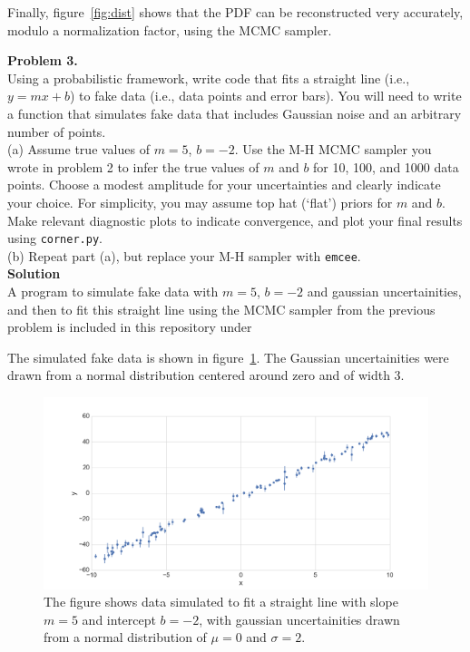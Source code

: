 \documentclass[12pt,usletter,english]{article}
\begin{document}
Finally, figure~\ref{fig:dist} shows that the PDF can be reconstructed
very accurately, modulo a normalization factor, using the MCMC
sampler. 

\newpage

\noindent \textbf{Problem 3.} \\ 

\noindent Using a probabilistic framework, write code that fits a
straight line (i.e., $y=mx+b$) to fake data (i.e., data points and
error bars).  You will need to write a function that simulates fake
data that includes Gaussian noise and an arbitrary number of
points. \\

(a) Assume true values of $m=5$, $b=-2$. Use the M-H MCMC sampler you
wrote in problem 2 to infer the true values of $m$ and $b$ for 10,
100, and 1000 data points.  Choose a modest amplitude for your
uncertainties and clearly indicate your choice. For simplicity, you
may assume top hat (`flat') priors for $m$ and $b$. Make relevant
diagnostic plots to indicate convergence, and plot your final results
using \texttt{corner.py}. \\

(b) Repeat part (a), but replace your M-H sampler with
\texttt{emcee}. \\

\noindent \textbf{Solution}\\

A program to simulate fake data with $m=5$, $b=-2$ and gaussian
uncertainities, and then to fit this straight line using the MCMC
sampler from the previous problem is included in this repository under

The simulated fake data is shown in figure~\ref{fig:fakedata}. The
Gaussian uncertainities were drawn from a normal distribution centered
around zero and of width 3. 

\begin{figure}[!h]
  \centering \includegraphics[width=13cm]{fake_data.png}
  \caption{The figure shows data simulated to fit a straight line with
    slope $m=5$ and intercept $b=-2$, with gaussian uncertainities
    drawn from a normal distribution of $\mu=0$ and $\sigma=2$.
    \label{fig:fakedata}}
\end{figure}
\end{document}
